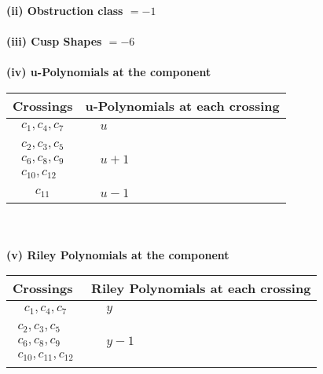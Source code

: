 \documentclass[1p]{elsarticle_modified}
\theoremstyle{definition}
\begin{document}
\flushleft \textbf{(ii) Obstruction class $= -1$}\\~\\
\flushleft \textbf{(iii) Cusp Shapes $= -6$}\\~\\
\newpage\renewcommand{\arraystretch}{1}
\flushleft \textbf{(iv) u-Polynomials at the component}\newline \\
\begin{tabular}{m{50pt}|m{274pt}}
Crossings & \hspace{64pt}u-Polynomials at each crossing \\
\hline $$\begin{aligned}c_{1},c_{4},c_{7}\end{aligned}$$&$\begin{aligned}
&u
\end{aligned}$\\
\hline $$\begin{aligned}c_{2},c_{3},c_{5}\\c_{6},c_{8},c_{9}\\c_{10},c_{12}\end{aligned}$$&$\begin{aligned}
&u+1
\end{aligned}$\\
\hline $$\begin{aligned}c_{11}\end{aligned}$$&$\begin{aligned}
&u-1
\end{aligned}$\\
\hline
\end{tabular}\\~\\
\newpage\renewcommand{\arraystretch}{1}
\flushleft \textbf{(v) Riley Polynomials at the component}\newline \\
\begin{tabular}{m{50pt}|m{274pt}}
Crossings & \hspace{64pt}Riley Polynomials at each crossing \\
\hline $$\begin{aligned}c_{1},c_{4},c_{7}\end{aligned}$$&$\begin{aligned}
&y
\end{aligned}$\\
\hline $$\begin{aligned}c_{2},c_{3},c_{5}\\c_{6},c_{8},c_{9}\\c_{10},c_{11},c_{12}\end{aligned}$$&$\begin{aligned}
&y-1
\end{aligned}$\\
\hline
\end{tabular}\\~\\
\end{document}
